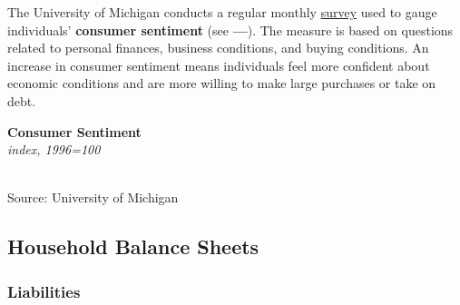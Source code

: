 \documentclass{report}
\makeatletter
\newcommand{\tbllink}[1]{\href{https://raw.githubusercontent.com/bdecon/US-chartbook/master/chartbook/data/#1}{\faTable}}
\newcommand*\short[1]{\expandafter\@gobbletwo\number\numexpr#1\relax}
\newcommand{\dateaxisticks}{
		date coordinates in=x, axis line style={draw=none},
		xmax={2020-05-10},
		max space between ticks=40,	    
		xtick={{1990-01-01}, {1992-01-01}, {1994-01-01}, 
			{1996-01-01}, {1998-01-01}, {2000-01-01}, 
			{2002-01-01}, {2004-01-01}, {2006-01-01},
			{2008-01-01}, {2010-01-01}, {2012-01-01}, {2014-01-01},
		    {2016-01-01}, {2018-01-01}, {2020-01-01}},
		minor xtick={{1989-01-01}, {1991-01-01}, {1993-01-01},
			{1995-01-01}, {1997-01-01}, {1999-01-01}, 
			{2001-01-01}, {2003-01-01}, {2005-01-01}, {2007-01-01},
		    {2009-01-01}, {2011-01-01}, {2013-01-01}, {2015-01-01},
		    {2017-01-01}, {2019-01-01}},
		enlarge y limits={0.06}, enlarge x limits={0.01},
		}
\newcommand{\bbar}[2]{extra #1 ticks = {{#2}}, extra #1 tick labels = ,
		extra #1 tick style = {grid=major, grid style={thick, black!25}},}
\newcommand{\stdline}[4]{\addplot[very thick, no markers, color=#1] 
		table [x=#2, y=#3, col sep=comma] {#4};	}
\newcommand{\rbars}{
		\fill[color=black!10] (axis cs:{1990-07-01},\pgfkeysvalueof{/pgfplots/ymin}) rectangle 
			(axis cs:{1991-03-01}, \pgfkeysvalueof{/pgfplots/ymax});
		\fill[color=black!10] (axis cs:{2007-12-01},\pgfkeysvalueof{/pgfplots/ymin}) rectangle 
			(axis cs:{2009-07-01}, \pgfkeysvalueof{/pgfplots/ymax});
		\fill[color=black!10] (axis cs:{2001-03-01},\pgfkeysvalueof{/pgfplots/ymin}) rectangle 
			(axis cs:{2001-11-01}, \pgfkeysvalueof{/pgfplots/ymax});}
\makeatother
\begin{document}
{{{{\begin{minipage}{0.76\textwidth}
\small The University of Michigan conducts a regular monthly \href{http://www.sca.isr.umich.edu/}{survey} used to gauge individuals' \textbf{consumer sentiment} (see {\color{violet!60!blue}\textbf{---}}). The measure is based on questions related to personal finances, business conditions, and buying conditions. An increase in consumer sentiment means individuals feel more confident about economic conditions and are more willing to make large purchases or take on debt. \\

\vspace{2mm}

\noindent \normalsize \textbf{Consumer Sentiment}\\
\footnotesize{\textit{index, 1996=100}}\\
\noindent \hspace*{-2mm} \\
\footnotesize{Source: University of Michigan}  \hfill \tbllink{umichsoc.csv}\\


\end{minipage}

\newpage

\begin{minipage}{0.76\textwidth}

\subsection*{\color{black!70} \seriffont Household Balance Sheets}

\subsubsection*{\color{black!70} \seriffont Liabilities}

\vspace{1mm}

\small  \\

\\


\end{minipage}}}}}
\end{document}
